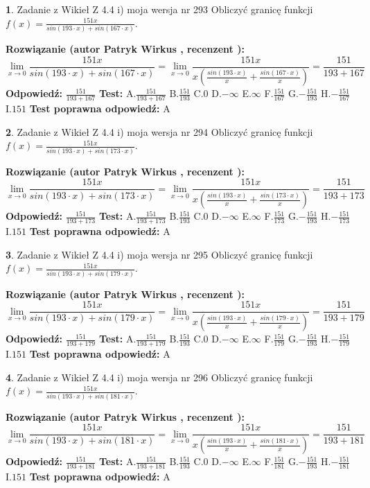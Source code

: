 \documentclass[12pt, a4paper]{article}
\theoremstyle{definition} %
\newtheorem{zad}{}
\newcommand{\zadStart}[1]{\begin{zad}#1\newline}
\newcommand{\zadStop}{\end{zad}}
\newcommand{\rozwStart}[2]{\noindent \textbf{Rozwiązanie (autor #1 , recenzent #2): }\newline}
\newcommand{\rozwStop}{\newline}
\newcommand{\odpStart}{\noindent \textbf{Odpowiedź:}\newline}
\newcommand{\odpStop}{\newline}
\newcommand{\testStart}{\noindent \textbf{Test:}\newline}
\newcommand{\testStop}{\newline}
\newcommand{\kluczStart}{\noindent \textbf{Test poprawna odpowiedź:}\newline}
\newcommand{\kluczStop}{\newline}
\begin{document}
\zadStart{Zadanie z Wikieł Z 4.4 i) moja wersja nr 293}
Obliczyć granicę funkcji $f(x)=\frac{151x}{sin(193\cdot x) +sin(167\cdot x)}$.
\zadStop
\rozwStart{Patryk Wirkus}{}
$$\lim\limits_{x\to 0}\frac{151x}{sin(193\cdot x) +sin(167\cdot x)}=\lim\limits_{x\to 0}\frac{151x}{x(\frac{sin(193\cdot x)}{x}+\frac{sin(167\cdot x)}{x})}=\frac{151}{193+167}$$
\rozwStop
\odpStart
$\frac{151}{193+167}$
\odpStop
\testStart
A.$\frac{151}{193+167}$
B.$\frac{151}{193}$
C.$0$
D.$-\infty$
E.$\infty$
F.$\frac{151}{167}$
G.$-\frac{151}{193}$
H.$-\frac{151}{167}$
I.$151$
\testStop
\kluczStart
A
\kluczStop



\zadStart{Zadanie z Wikieł Z 4.4 i) moja wersja nr 294}
Obliczyć granicę funkcji $f(x)=\frac{151x}{sin(193\cdot x) +sin(173\cdot x)}$.
\zadStop
\rozwStart{Patryk Wirkus}{}
$$\lim\limits_{x\to 0}\frac{151x}{sin(193\cdot x) +sin(173\cdot x)}=\lim\limits_{x\to 0}\frac{151x}{x(\frac{sin(193\cdot x)}{x}+\frac{sin(173\cdot x)}{x})}=\frac{151}{193+173}$$
\rozwStop
\odpStart
$\frac{151}{193+173}$
\odpStop
\testStart
A.$\frac{151}{193+173}$
B.$\frac{151}{193}$
C.$0$
D.$-\infty$
E.$\infty$
F.$\frac{151}{173}$
G.$-\frac{151}{193}$
H.$-\frac{151}{173}$
I.$151$
\testStop
\kluczStart
A
\kluczStop



\zadStart{Zadanie z Wikieł Z 4.4 i) moja wersja nr 295}
Obliczyć granicę funkcji $f(x)=\frac{151x}{sin(193\cdot x) +sin(179\cdot x)}$.
\zadStop
\rozwStart{Patryk Wirkus}{}
$$\lim\limits_{x\to 0}\frac{151x}{sin(193\cdot x) +sin(179\cdot x)}=\lim\limits_{x\to 0}\frac{151x}{x(\frac{sin(193\cdot x)}{x}+\frac{sin(179\cdot x)}{x})}=\frac{151}{193+179}$$
\rozwStop
\odpStart
$\frac{151}{193+179}$
\odpStop
\testStart
A.$\frac{151}{193+179}$
B.$\frac{151}{193}$
C.$0$
D.$-\infty$
E.$\infty$
F.$\frac{151}{179}$
G.$-\frac{151}{193}$
H.$-\frac{151}{179}$
I.$151$
\testStop
\kluczStart
A
\kluczStop



\zadStart{Zadanie z Wikieł Z 4.4 i) moja wersja nr 296}
Obliczyć granicę funkcji $f(x)=\frac{151x}{sin(193\cdot x) +sin(181\cdot x)}$.
\zadStop
\rozwStart{Patryk Wirkus}{}
$$\lim\limits_{x\to 0}\frac{151x}{sin(193\cdot x) +sin(181\cdot x)}=\lim\limits_{x\to 0}\frac{151x}{x(\frac{sin(193\cdot x)}{x}+\frac{sin(181\cdot x)}{x})}=\frac{151}{193+181}$$
\rozwStop
\odpStart
$\frac{151}{193+181}$
\odpStop
\testStart
A.$\frac{151}{193+181}$
B.$\frac{151}{193}$
C.$0$
D.$-\infty$
E.$\infty$
F.$\frac{151}{181}$
G.$-\frac{151}{193}$
H.$-\frac{151}{181}$
I.$151$
\testStop
\kluczStart
A
\kluczStop
\end{document}
